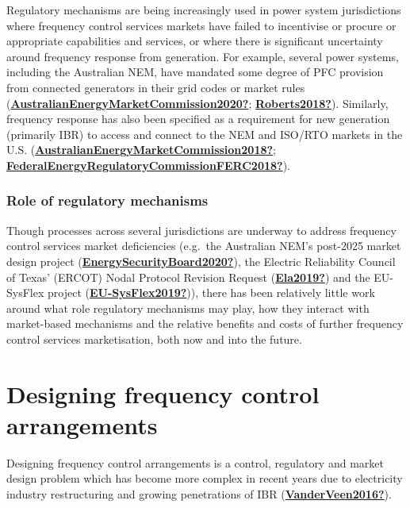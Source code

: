 \documentclass[12pt,a4paper,]{report}
\begin{document}
Regulatory mechanisms are being increasingly used in power system
jurisdictions where frequency control services markets have failed to
incentivise or procure or appropriate capabilities and services, or
where there is significant uncertainty around frequency response from
generation. For example, several power systems, including the Australian
NEM, have mandated some degree of PFC provision from connected
generators in their grid codes or market rules
(\protect\hyperlink{ref-AustralianEnergyMarketCommission2020}{\textbf{AustralianEnergyMarketCommission2020?}};
\protect\hyperlink{ref-Roberts2018}{\textbf{Roberts2018?}}). Similarly,
frequency response has also been specified as a requirement for new
generation (primarily IBR) to access and connect to the NEM and ISO/RTO
markets in the U.S.
(\protect\hyperlink{ref-AustralianEnergyMarketCommission2018}{\textbf{AustralianEnergyMarketCommission2018?}};
\protect\hyperlink{ref-FederalEnergyRegulatoryCommissionFERC2018}{\textbf{FederalEnergyRegulatoryCommissionFERC2018?}}).

\hypertarget{role-of-regulatory-mechanisms}{%
\subsubsection{Role of regulatory
mechanisms}\label{role-of-regulatory-mechanisms}}

Though processes across several jurisdictions are underway to address
frequency control services market deficiencies (e.g.~the Australian
NEM's post-2025 market design project
(\protect\hyperlink{ref-EnergySecurityBoard2020}{\textbf{EnergySecurityBoard2020?}}),
the Electric Reliability Council of Texas' (ERCOT) Nodal Protocol
Revision Request (\protect\hyperlink{ref-Ela2019}{\textbf{Ela2019?}})
and the EU-SysFlex project
(\protect\hyperlink{ref-EU-SysFlex2019}{\textbf{EU-SysFlex2019?}})),
there has been relatively little work around what role regulatory
mechanisms may play, how they interact with market-based mechanisms and
the relative benefits and costs of further frequency control services
marketisation, both now and into the future.

\hypertarget{sec:designing_arrangements}{%
\section{Designing frequency control
arrangements}\label{sec:designing_arrangements}}

Designing frequency control arrangements is a control, regulatory and
market design problem which has become more complex in recent years due
to electricity industry restructuring and growing penetrations of IBR
(\protect\hyperlink{ref-VanderVeen2016}{\textbf{VanderVeen2016?}}).
\end{document}
